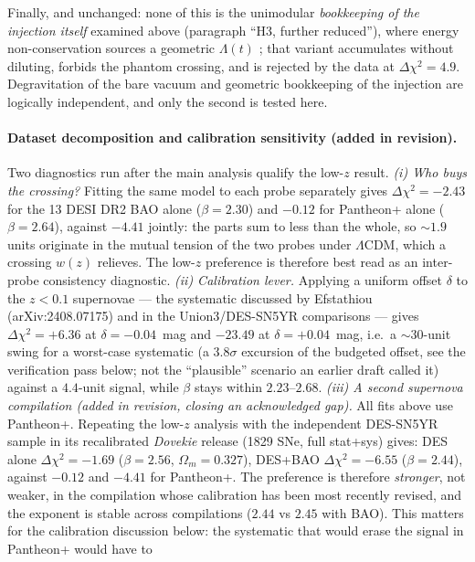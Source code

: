 \documentclass[11pt]{article}
\begin{document}
Finally, and unchanged: none of this is the unimodular \emph{bookkeeping of the injection itself}
examined above (paragraph ``H3, further reduced''), where energy non-conservation sources a
geometric $\Lambda(t)$ \cite{Josset2017}; that variant accumulates without diluting, forbids the
phantom crossing, and is rejected by the data at $\Delta\chi^2 = 4.9$. Degravitation of the bare
vacuum and geometric bookkeeping of the injection are logically independent, and only the second
is tested here.

\paragraph{Dataset decomposition and calibration sensitivity (added in revision).} Two diagnostics
run after the main analysis qualify the low-$z$ result. \emph{(i) Who buys the crossing?} Fitting the
same model to each probe separately gives $\Delta\chi^2 = -2.43$ for the 13 DESI DR2 BAO alone
($\beta = 2.30$) and $-0.12$ for Pantheon+ alone ($\beta = 2.64$), against $-4.41$ jointly: the parts
sum to less than the whole, so $\sim 1.9$ units originate in the mutual tension of the two probes
under $\Lambda$CDM, which a crossing $w(z)$ relieves. The low-$z$ preference is therefore best read as
an inter-probe consistency diagnostic. \emph{(ii) Calibration lever.} Applying a uniform offset
$\delta$ to the $z<0.1$ supernovae --- the systematic discussed by Efstathiou (arXiv:2408.07175) and
in the Union3/DES-SN5YR comparisons --- gives $\Delta\chi^2 = +6.36$ at $\delta = -0.04$~mag and
$-23.49$ at $\delta = +0.04$~mag, i.e.\ a $\sim 30$-unit swing for a worst-case systematic (a $3.8\sigma$ excursion of the budgeted offset, see the verification pass below; not the ``plausible'' scenario an earlier draft called it) against a
$4.4$-unit signal, while $\beta$ stays within $2.23$--$2.68$. \emph{(iii) A second supernova compilation (added in revision, closing an acknowledged gap).}
All fits above use Pantheon+. Repeating the low-$z$ analysis with the independent DES-SN5YR sample
in its recalibrated \emph{Dovekie} release (1829 SNe, full stat+sys) gives: DES alone
$\Delta\chi^2 = -1.69$ ($\beta = 2.56$, $\Omega_m = 0.327$), DES+BAO $\Delta\chi^2 = -6.55$
($\beta = 2.44$), against $-0.12$ and $-4.41$ for Pantheon+. The preference is therefore
\emph{stronger}, not weaker, in the compilation whose calibration has been most recently revised,
and the exponent is stable across compilations ($2.44$ vs $2.45$ with BAO). This matters for the
calibration discussion below: the systematic that would erase the signal in Pantheon+ would have to
\end{document}
